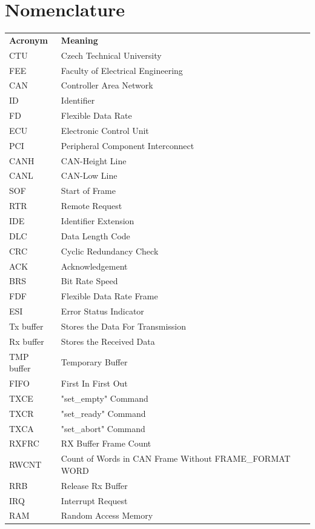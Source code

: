 \documentclass{ctuthesis}
\begin{document}
\maketitle
\chapter*{Nomenclature}

\noindent
\begin{tabularx}{\linewidth}
  { l >{\raggedright\arraybackslash}X }
\bfseries Acronym  & \bfseries Meaning \\\Midrule
CTU & Czech Technical University \\
FEE & Faculty of Electrical Engineering \\
CAN & Controller Area Network \\
ID & Identifier \\
FD & Flexible Data Rate \\
ECU & Electronic Control Unit \\
PCI & Peripheral Component Interconnect \\
CANH & CAN-Height Line \\
CANL & CAN-Low Line \\
SOF & Start of Frame \\
RTR & Remote Request \\
IDE & Identifier Extension \\
DLC & Data Length Code \\
CRC & Cyclic Redundancy Check \\
ACK & Acknowledgement \\
BRS & Bit Rate Speed \\
FDF & Flexible Data Rate Frame \\
ESI & Error Status Indicator \\
Tx buffer & Stores the Data For Transmission \\
Rx buffer & Stores the Received Data \\
TMP buffer & Temporary Buffer \\
FIFO & First In First Out \\
TXCE & "set\_empty" Command \\
TXCR & "set\_ready" Command \\
TXCA & "set\_abort" Command \\
RXFRC & RX Buffer Frame Count \\
RWCNT & Count of Words in CAN Frame Without FRAME\_FORMAT WORD \\
RRB & Release Rx Buffer \\
IRQ & Interrupt Request \\
RAM & Random Access Memory \\
\end{tabularx}
\end{document}
